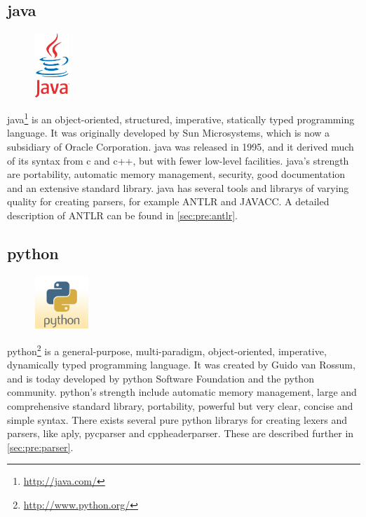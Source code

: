 \subsection{\Gls{java}}
\label{sec:pre:java}
\begin{figure}
	\vspace{-30pt}
	\includegraphics[width=1.3cm]{./planning/img/java_logo}
	\vspace{-30pt}
\end{figure}
\Gls{java}\footnote{\url{http://java.com/}} is an object-oriented, structured,
imperative, statically typed programming language. It was originally developed
by Sun Microsystems, which is now a subsidiary of Oracle Corporation. \Gls{java} was
released in 1995, and it derived much of its syntax from \Gls{c} and \Gls{c++}, but with
fewer low-level facilities. \Gls{java}’s strength are portability, automatic memory
management, security, good documentation and an extensive standard \gls{library}.
\Gls{java} has several tools and \glspl{library} of varying quality for creating \glspl{parser},
for example ANTLR and JAVACC. A detailed description of ANTLR can be found in 
\autoref{sec:pre:antlr}.

\subsection{python}
\label{sec:pre:python}
\begin{figure}
	\vspace{-20pt}
	\includegraphics[width=2cm]{./planning/img/python_logo}
	\vspace{-20pt}
\end{figure}
\Gls{python}\footnote{\url{http://www.python.org/}} is a general-purpose,
multi-paradigm, object-oriented, imperative, dynamically typed programming
language. It was created by Guido van Rossum, and is today developed by \Gls{python}
Software Foundation and the \Gls{python} community. \Gls{python}’s strength include
automatic memory management, large and comprehensive standard \gls{library},
portability, powerful but very clear, concise and simple syntax. There exists
several pure \Gls{python} \glspl{library} for creating \glspl{lexer} and \glspl{parser}, like \Gls{aply},
\gls{pycparser} and cppheaderparser. These are described further in
\autoref{sec:pre:parser}.


